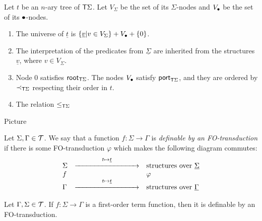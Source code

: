 \begin{itemize}
 Let $t$ be an $n$-ary tree of $\mathsf T \Sigma$. Let $V_\Sigma$ be  the set of its $\Sigma$-nodes and $V_\bullet$ be the set of its $\bullet$-nodes. 
\begin{enumerate}
\item The universe of $\underline{t}$ is $\{\underline{v}| v\in V_\Sigma\}+ V_\bullet+\{0\}$.
\item The interpretation of the predicates from $\underline \Sigma$ are inherited from the structures $\underline{v}$, where $v\in V_\Sigma$.
\item Node $0$ satisfies $\mathsf{root}_{\mathsf T\Sigma}$. The nodes $V_\bullet$ satisfy $\mathsf{port}_{\mathsf T\Sigma}$, and they are ordered by $\prec_{\mathsf T\Sigma}$ respecting their order in $t$. 
\item The relation $\leq_{\mathsf T\Sigma}$ 
\end{enumerate}
\begin{center}
Picture
\end{center}
 \end{itemize}  

\begin{definition} Let $\Sigma, \Gamma\in {\mathcal T}$. We say that a function $f:\Sigma\to \Gamma$ is \emph{definable by an FO-transduction} if there is some FO-transduction $\varphi$ which makes the following diagram commutes:
\[\begin{array}{lll}
\Sigma& \stackrel{t\mapsto \underline{t}}{\xrightarrow{\hspace*{3cm}}} & \text{structures over }\underline \Sigma \\
f&&\varphi\\
\Gamma& \stackrel{t\mapsto \underline{t}}{\xrightarrow{\hspace*{3cm}}}  & \text{structures over }\underline \Gamma 
\end{array}\]
\end{definition}

\begin{proposition}
Let $\Gamma, \Sigma \in {\mathcal T}$. If $f:\Sigma\to\Gamma$ is a first-order term function, then it is definable by an FO-transduction. 
\end{proposition}

